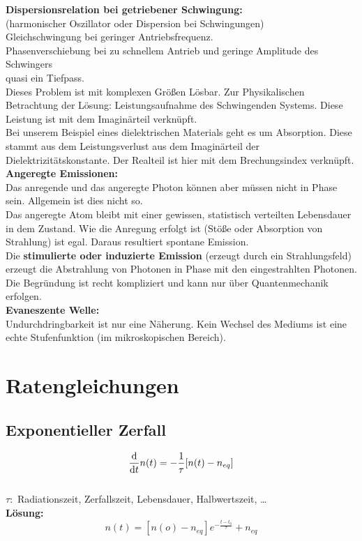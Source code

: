 \textbf{Dispersionsrelation bei getriebener Schwingung:}\\
(harmonischer Oszillator oder Dispersion bei Schwingungen)\\
Gleichschwingung bei geringer Antriebsfrequenz.\\
Phasenverschiebung bei zu schnellem Antrieb und geringe Amplitude des Schwingers\\
quasi ein Tiefpass.\\
Dieses Problem ist mit komplexen Größen Lösbar. Zur Physikalischen Betrachtung der Lösung: Leistungsaufnahme des Schwingenden Systems. Diese Leistung ist mit dem Imaginärteil verknüpft.\\
Bei unserem Beispiel eines dielektrischen Materials geht es um Absorption. Diese stammt aus dem Leistungsverlust aus dem Imaginärteil der Dielektrizitätskonstante. Der Realteil ist hier mit dem Brechungsindex verknüpft.\\[5pt]
\textbf{Angeregte Emissionen:}\\
Das anregende und das angeregte Photon können aber müssen nicht in Phase sein. Allgemein ist dies nicht so.\\
Das angeregte Atom bleibt mit einer gewissen, statistisch verteilten Lebensdauer in dem Zustand. Wie die Anregung erfolgt ist (Stöße oder Absorption von Strahlung) ist egal. Daraus resultiert spontane Emission.\\
Die \textbf{stimulierte oder induzierte Emission} (erzeugt durch ein Strahlungsfeld) erzeugt die Abstrahlung von Photonen in Phase mit den eingestrahlten Photonen. Die Begründung ist recht kompliziert und kann nur über Quantenmechanik erfolgen.\\[5pt]
\textbf{Evaneszente Welle:}\\
Undurchdringbarkeit ist nur eine Näherung. Kein Wechsel des Mediums ist eine echte Stufenfunktion (im mikroskopischen Bereich).


\section{Ratengleichungen}

\subsection{Exponentieller Zerfall}

\begin{equation*}
\frac{\textrm{d} }{\textrm{d} t} n(t) = - \frac{1}{\tau} [n(t) - n_{eq} ]
\end{equation*}
\\
$ \tau : $ Radiationszeit, Zerfallszeit, Lebensdauer, Halbwertszeit, \dots\\
\textbf{Lösung:}
\begin{equation*}
n(t) = [n(o) - n_{eq}] e^{-\frac{t - t_0}{\tau}} + n_{eq}
\end{equation*}

